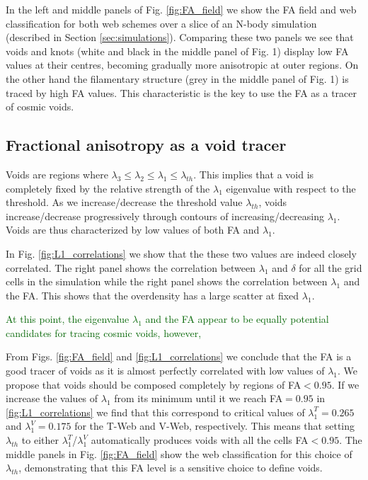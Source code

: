 \documentclass[a4,useAMS,usenatbib,usegraphicx]{mn2e}
\newcommand{\after}[1]{\textcolor{darkgreen}{ #1}}
\begin{document}
In the left and middle panels of Fig. \ref{fig:FA_field} we show the
FA field and web classification for both  web schemes over a slice of
an N-body simulation (described in Section \ref{sec:simulations}). 
Comparing these two panels we see that voids and knots (white
and black in the middle panel of Fig. 1) display low FA values at
their  centres, becoming gradually more anisotropic at outer regions.  
On the other hand the filamentary structure (grey in the middle panel
of Fig. 1) is traced by high FA values.  
This characteristic is the  key to use the FA as a tracer of cosmic
voids.  


\subsection{Fractional anisotropy as a void tracer}
\label{subsec:web_voids}



Voids are regions where $\lambda_3\leq\lambda_2\leq
\lambda_1\leq\lambda_{th}$. 
This implies that a void is completely fixed by the relative strength
of the $\lambda_1$ eigenvalue with respect to the threshold.   
As we increase/decrease the threshold value $\lambda_{th}$, voids
increase/decrease progressively through contours of
increasing/decreasing $\lambda_1$.  
Voids are thus characterized by low values of both FA and
$\lambda_1$.  


In Fig. \ref{fig:L1_correlations} we show that the these two values
are indeed closely correlated.  
The right panel shows the correlation between $\lambda_1$ and $\delta$ for
all the grid cells in the simulation while the right panel shows the
correlation between $\lambda_1$ and the FA. This shows that the
overdensity has a large scatter at fixed $\lambda_1$. 

\after{At this point, the eigenvalue $\lambda_1$ and the FA appear to be
equally potential candidates for tracing cosmic voids, however, }

From Figs. \ref{fig:FA_field} and \ref{fig:L1_correlations} we
conclude that the FA is a good tracer of voids as it is almost perfectly
correlated with low values of $\lambda_1$. 
We propose that voids should be composed completely by regions of
FA$<0.95$.
If we increase the values of $\lambda_1$ from its minimum until it
we reach FA$=0.95$ in \ref{fig:L1_correlations} we find that this
correspond to critical values of $\lambda_{1}^T = 0.265$ and
$\lambda_{1}^V = 0.175$ for the T-Web and V-Web, respectively.
This means that setting $\lambda_{th}$ to either
$\lambda_{1}^T$/$\lambda_{1}^{V}$ automatically produces voids with
all the cells FA$<0.95$.   
The middle panels in Fig. \ref{fig:FA_field} show the web
classification for this choice of $\lambda_{th}$, demonstrating that
this FA level is a sensitive choice to define voids.
\end{document}

